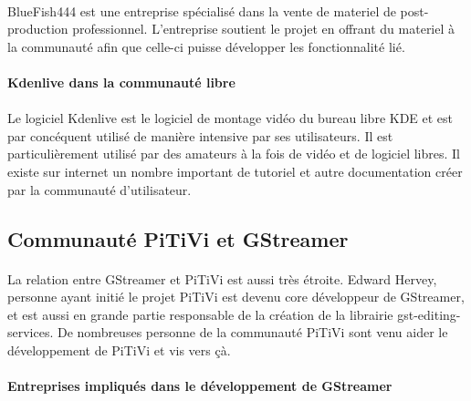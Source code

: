 \paragraph{} BlueFish444 est une entreprise spécialisé dans la vente
de materiel de post-production professionnel. L'entreprise soutient
le projet en offrant du materiel  à la communauté afin que celle-ci
puisse développer les fonctionnalité lié.

\paragraph{Kdenlive dans la communauté libre}

\paragraph{}

Le logiciel Kdenlive est le logiciel de montage vidéo du bureau libre
KDE et est par concéquent utilisé de manière intensive par ses
utilisateurs. Il est particulièrement utilisé par des amateurs à la
fois de vidéo et de logiciel libres. Il existe sur internet un nombre
important de tutoriel et autre documentation créer par la communauté
d'utilisateur.

\subsection {Communauté PiTiVi et GStreamer}

\paragraph {}

La relation entre GStreamer et PiTiVi est aussi très étroite. Edward
Hervey, personne ayant initié le projet PiTiVi est devenu core
développeur de GStreamer, et est aussi en grande partie responsable de
la création de la librairie gst-editing-services. De nombreuses personne
de la communauté PiTiVi sont venu aider le développement de PiTiVi et vis
vers çà.

\paragraph {Entreprises impliqués dans le développement de GStreamer}

\paragraph{}

